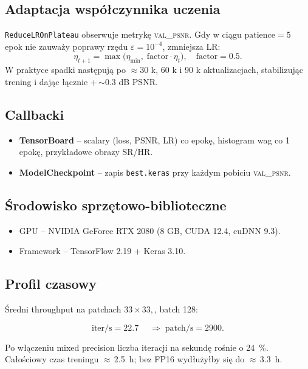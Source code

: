 \documentclass[11pt]{article}
\begin{document}
\subsection{Adaptacja współczynnika uczenia}

\texttt{ReduceLROnPlateau} obserwuje metrykę \textsc{val\_psnr}.
Gdy w ciągu \(\text{patience}=5\) epok nie zauważy poprawy rzędu
\(\varepsilon=10^{-4}\), zmniejsza LR:
\begin{equation}
  \eta_{t+1} =
  \max\bigl(\eta_\text{min},\;
            \text{factor}\cdot\eta_{t}\bigr),
  \quad
  \text{factor}=0.5.
  \label{eq:rlrop}
\end{equation}
W praktyce spadki następują po \(\approx\)30 k, 60 k i 90 k
aktualizacjach, stabilizując trening i dając łącznie
+\,\(\sim\)0.3 dB PSNR.

\subsection{Callbacki}

\begin{itemize}
  \item \textbf{TensorBoard} – scalary (loss, PSNR, LR) co epokę,
        histogram wag co 1 epokę, przykładowe obrazy SR/HR.
  \item \textbf{ModelCheckpoint} – zapis \texttt{best.keras} przy każdym
        pobiciu \textsc{val\_psnr}.
\end{itemize}

\subsection{Środowisko sprzętowo-biblioteczne}

\begin{itemize}
  \item GPU – NVIDIA GeForce RTX 2080 (8 GB, CUDA 12.4, cuDNN 9.3).
  \item Framework – TensorFlow 2.19 + Keras 3.10.
\end{itemize}

\subsection{Profil czasowy}

Średni throughput na patchach
$33 \times 33, $, batch 128:

\[
\text{iter/s}=\num{22.7}\;\quad\Rightarrow\;
\text{patch/s}=\num{2900}.
\]

Po włączeniu mixed precision liczba iteracji na sekundę rośnie
o \SI{24}{\percent}.  Całościowy czas treningu
$\approx$\,\SI{2.5}{h}; bez FP16 wydłużyłby się do
$\approx$\,\SI{3.3}{h}.
\end{document}

